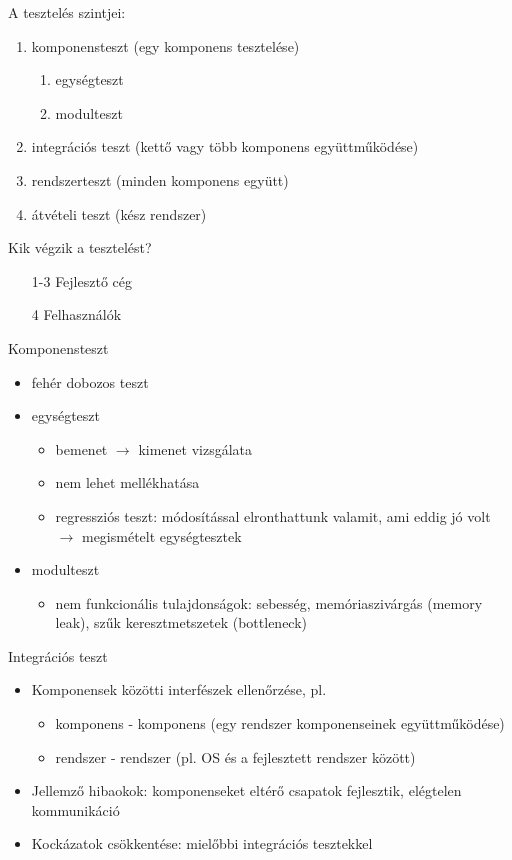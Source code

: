 \documentclass[usenames,dvipsnames,aspectratio=169]{beamer}
\begin{document}
\begin{frame}
  A tesztelés szintjei:
  \begin{enumerate}
    \item komponensteszt (egy komponens tesztelése)
    \begin{enumerate}
      \item egységteszt
      \item modulteszt
    \end{enumerate}
    \item integrációs teszt (kettő vagy több komponens együttműködése)
    \item rendszerteszt (minden komponens együtt)
    \item átvételi teszt (kész rendszer)
  \end{enumerate}
\end{frame}

\begin{frame}
  Kik végzik a tesztelést?
  \begin{itemize}
    \item[1-3] Fejlesztő cég
    \item[4] Felhasználók
  \end{itemize}
  Komponensteszt
  \begin{itemize}
    \item fehér dobozos teszt
    \item egységteszt
    \begin{itemize}
      \item bemenet $\to$ kimenet vizsgálata
      \item nem lehet mellékhatása
      \item regressziós teszt: módosítással elronthattunk valamit, ami eddig jó volt $\to$ megismételt egységtesztek
    \end{itemize}
    \item modulteszt
    \begin{itemize}
      \item nem funkcionális tulajdonságok: sebesség, memóriaszivárgás (memory leak), szűk keresztmetszetek (bottleneck)
    \end{itemize}
  \end{itemize}
\end{frame}

\begin{frame}
  Integrációs teszt
  \begin{itemize}
    \item Komponensek közötti interfészek ellenőrzése, pl.
    \begin{itemize}
      \item komponens - komponens (egy rendszer komponenseinek együttműködése)
      \item rendszer - rendszer (pl. OS és a fejlesztett rendszer között)
    \end{itemize}
    \item Jellemző hibaokok: komponenseket eltérő csapatok fejlesztik, elégtelen kommunikáció
    \item Kockázatok csökkentése: mielőbbi integrációs tesztekkel
  \end{itemize}
\end{frame}
\end{document}
